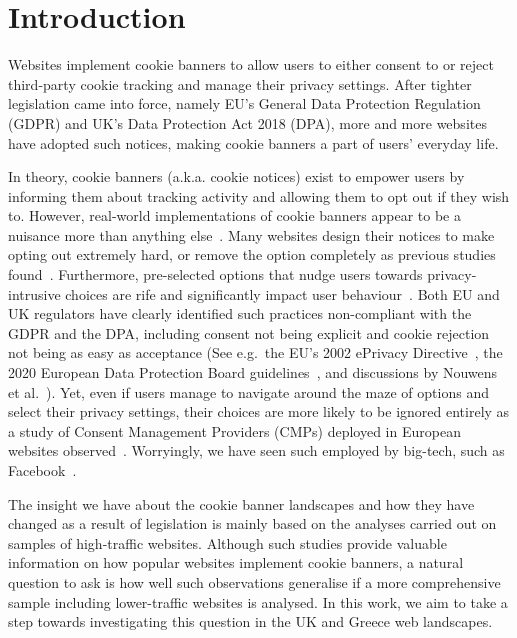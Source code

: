 \section{Introduction}
Websites implement cookie banners to allow users to either consent to or reject third-party cookie tracking and manage their privacy settings. After tighter legislation came into force, namely EU's General Data Protection Regulation (GDPR) and UK's Data Protection Act 2018 (DPA), more and more websites have adopted such notices, making cookie banners a part of users' everyday life. 

In theory, cookie banners (a.k.a. cookie notices) exist to empower users by informing them about tracking activity and allowing them to opt out if they wish to. However, real-world implementations of cookie banners appear to be a nuisance more than anything else~\cite{kulyk2018website}. Many websites design their notices to make opting out extremely hard, or remove the option completely as previous studies found~\cite{nouwens2020dark}. Furthermore, pre-selected options that nudge users towards privacy-intrusive choices are rife and significantly impact user behaviour~\cite{utz2019informed}. 
Both EU and UK regulators have clearly identified such  practices non-compliant with the GDPR and the DPA, including consent not being explicit and cookie rejection not being as easy as acceptance (See e.g.\ the EU's 2002 ePrivacy Directive~\cite{eprivacy-directive-2002}, the 2020 European Data Protection Board guidelines~\cite{edpb-guidelines-2020}, and discussions by Nouwens et al.~\cite{nouwens2020dark}). 
Yet, even if users manage to navigate around the maze of options and select their privacy settings, their choices are more likely to be ignored entirely as a study of Consent Management Providers (CMPs) deployed in European websites observed~\cite{matte2020cookie}. Worryingly, we have seen such  employed by big-tech, such as Facebook~\cite{council2018deceived}. 

The insight we have about the cookie banner landscapes and how they have changed as a result of legislation is mainly based on the analyses carried out on samples of high-traffic websites. Although such studies provide valuable information on how popular websites implement cookie banners, a natural question to ask is how well such observations generalise if a more comprehensive sample including lower-traffic websites is analysed. 
In this work, we aim to take a step towards investigating this question in the UK and Greece web landscapes. 

